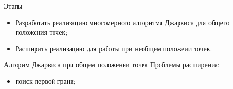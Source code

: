 \documentclass[]{beamer} %
\begin{document}
\begin{frame}{Этапы}
       \begin{itemize}
        \item  Разработать реализацию многомерного алгоритма Джарвиса для общего положения точек;
        \item Расширить реализацию для работы при необщем положеии точек.
        \end{itemize}
\end{frame}

\begin{frame}{Алгорим Джарвиса при общем положении точек}
    Проблемы расширения:
       \begin{itemize}
        \item  поиск первой грани;
        \end{itemize}
\end{frame}


\end{document}
